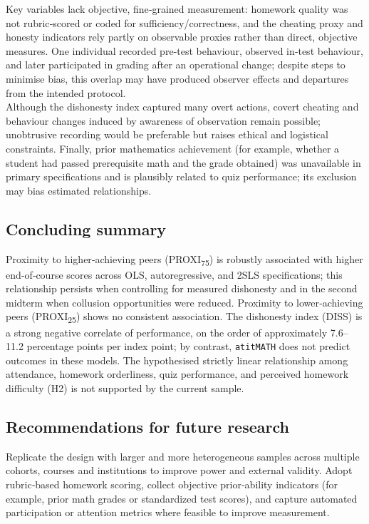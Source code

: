 \documentclass[]{article}
\begin{document}
Key variables lack objective, fine‑grained measurement: homework quality was not rubric‑scored or coded for sufficiency/correctness, and the cheating proxy and honesty indicators rely partly on observable proxies rather than direct, objective measures. One individual recorded pre‑test behaviour, observed in‑test behaviour, and later participated in grading after an operational change; despite steps to minimise bias, this overlap may have produced observer effects and departures from the intended protocol.\\

Although the dishonesty index captured many overt actions, covert cheating and behaviour changes induced by awareness of observation remain possible; unobtrusive recording would be preferable but raises ethical and logistical constraints. Finally, prior mathematics achievement (for example, whether a student had passed prerequisite math and the grade obtained) was unavailable in primary specifications and is plausibly related to quiz performance; its exclusion may bias estimated relationships.

\subsection{Concluding summary}

Proximity to higher‑achieving peers (PROXI\textsubscript{75}) is robustly associated with higher end‑of‑course scores across OLS, autoregressive, and 2SLS specifications; this relationship persists when controlling for measured dishonesty and in the second midterm when collusion opportunities were reduced. Proximity to lower‑achieving peers (PROXI\textsubscript{25}) shows no consistent association. The dishonesty index (DISS) is a strong negative correlate of performance, on the order of approximately 7.6–11.2 percentage points per index point; by contrast, \texttt{atitMATH} does not predict outcomes in these models. The hypothesised strictly linear relationship among attendance, homework orderliness, quiz performance, and perceived homework difficulty (H2) is not supported by the current sample.

\subsection{Recommendations for future research}

Replicate the design with larger and more heterogeneous samples across multiple cohorts, courses and institutions to improve power and external validity. Adopt rubric‑based homework scoring, collect objective prior‑ability indicators (for example, prior math grades or standardized test scores), and capture automated participation or attention metrics where feasible to improve measurement.\\
\end{document}
